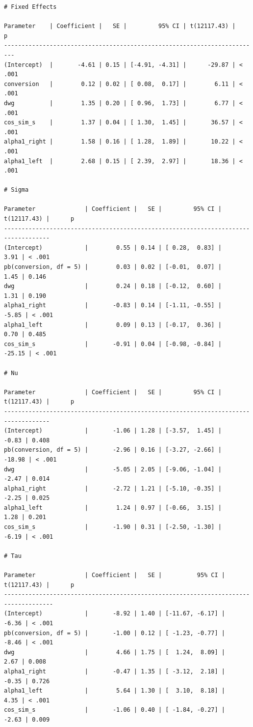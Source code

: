 \documentclass[
]{article}
\begin{document}
\begin{verbatim}
# Fixed Effects

Parameter    | Coefficient |   SE |         95% CI | t(12117.43) |      p
-------------------------------------------------------------------------
(Intercept)  |       -4.61 | 0.15 | [-4.91, -4.31] |      -29.87 | < .001
conversion   |        0.12 | 0.02 | [ 0.08,  0.17] |        6.11 | < .001
dwg          |        1.35 | 0.20 | [ 0.96,  1.73] |        6.77 | < .001
cos_sim_s    |        1.37 | 0.04 | [ 1.30,  1.45] |       36.57 | < .001
alpha1_right |        1.58 | 0.16 | [ 1.28,  1.89] |       10.22 | < .001
alpha1_left  |        2.68 | 0.15 | [ 2.39,  2.97] |       18.36 | < .001

# Sigma

Parameter              | Coefficient |   SE |         95% CI | t(12117.43) |      p
-----------------------------------------------------------------------------------
(Intercept)            |        0.55 | 0.14 | [ 0.28,  0.83] |        3.91 | < .001
pb(conversion, df = 5) |        0.03 | 0.02 | [-0.01,  0.07] |        1.45 | 0.146 
dwg                    |        0.24 | 0.18 | [-0.12,  0.60] |        1.31 | 0.190 
alpha1_right           |       -0.83 | 0.14 | [-1.11, -0.55] |       -5.85 | < .001
alpha1_left            |        0.09 | 0.13 | [-0.17,  0.36] |        0.70 | 0.485 
cos_sim_s              |       -0.91 | 0.04 | [-0.98, -0.84] |      -25.15 | < .001

# Nu

Parameter              | Coefficient |   SE |         95% CI | t(12117.43) |      p
-----------------------------------------------------------------------------------
(Intercept)            |       -1.06 | 1.28 | [-3.57,  1.45] |       -0.83 | 0.408 
pb(conversion, df = 5) |       -2.96 | 0.16 | [-3.27, -2.66] |      -18.98 | < .001
dwg                    |       -5.05 | 2.05 | [-9.06, -1.04] |       -2.47 | 0.014 
alpha1_right           |       -2.72 | 1.21 | [-5.10, -0.35] |       -2.25 | 0.025 
alpha1_left            |        1.24 | 0.97 | [-0.66,  3.15] |        1.28 | 0.201 
cos_sim_s              |       -1.90 | 0.31 | [-2.50, -1.30] |       -6.19 | < .001

# Tau

Parameter              | Coefficient |   SE |          95% CI | t(12117.43) |      p
------------------------------------------------------------------------------------
(Intercept)            |       -8.92 | 1.40 | [-11.67, -6.17] |       -6.36 | < .001
pb(conversion, df = 5) |       -1.00 | 0.12 | [ -1.23, -0.77] |       -8.46 | < .001
dwg                    |        4.66 | 1.75 | [  1.24,  8.09] |        2.67 | 0.008 
alpha1_right           |       -0.47 | 1.35 | [ -3.12,  2.18] |       -0.35 | 0.726 
alpha1_left            |        5.64 | 1.30 | [  3.10,  8.18] |        4.35 | < .001
cos_sim_s              |       -1.06 | 0.40 | [ -1.84, -0.27] |       -2.63 | 0.009 
\end{verbatim}
\end{document}
